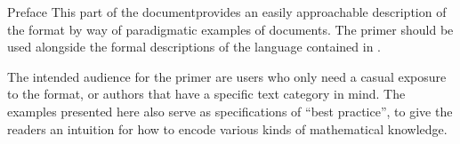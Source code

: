 
\begin{omgroup}[id=preface,display=flow]{Preface}
  This \ifbook part of the {\report}\else document\fi provides an easily approachable
  description of the {\omdoc} format by way of paradigmatic examples of {\omdoc}
  documents.  The primer should be used alongside the formal descriptions of the language
  contained in {}.

  The intended audience for the primer are users who only need a casual exposure to the
  format, or authors that have a specific text category in mind.  The examples presented
  here also serve as specifications of ``best practice'', to give the readers an intuition
  for how to encode various kinds of mathematical knowledge.
\end{omgroup}


